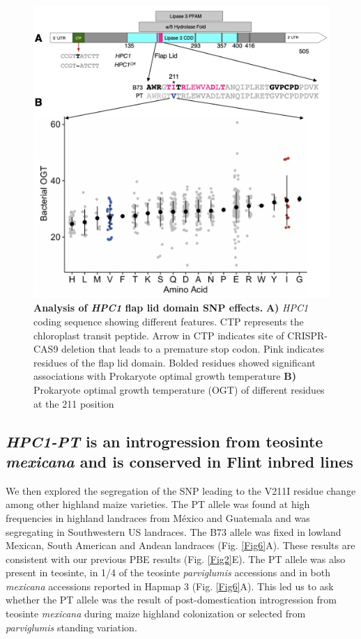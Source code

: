 \documentclass[9pt,twocolumn,twoside,lineno]{BioRxiv}
\begin{document}
\begin{figure}[!ht]
\begin{center}
\includegraphics[width=0.4\paperwidth]{Figures/Fig_5.png}
\caption{\textbf{Analysis of \textit{HPC1} flap lid domain SNP effects.}  
\textbf{A)} \textit{HPC1} coding sequence showing different features. 
CTP represents the chloroplast transit peptide. 
Arrow in CTP indicates site of CRISPR-CAS9 deletion that leads to a premature stop codon.
Pink indicates residues of the flap lid domain.
Bolded residues showed significant associations with Prokaryote optimal growth temperature 
\textbf{B)} Prokaryote optimal growth temperature (OGT) of different residues at the 211 position}
\label{Fig5}
\end{center}
\end{figure}

\subsection{\textit{HPC1-PT} is an introgression from teosinte \textit{mexicana} and is conserved in Flint inbred lines} 
We then explored the segregation of the SNP leading to the V211I residue change among other highland maize varieties.
The PT allele was found at high frequencies in highland landraces from México and Guatemala and was segregating in Southwestern US landraces. 
The B73 allele was fixed in lowland Mexican, South American and Andean landraces (Fig. \ref{Fig6}A). 
These results are consistent with our previous PBE results (Fig. \ref{Fig2}E).
The PT allele was also present in teosinte, in 1/4 of the teosinte \textit{parviglumis} accessions and in both \textit{mexicana} accessions reported in Hapmap 3 \cite{Bukowski2017-ng} (Fig. \ref{Fig6}A). 
This led us to ask whether the PT allele was the result of post-domestication introgression from teosinte \textit{mexicana} during maize highland colonization or selected from \textit{parviglumis} standing variation.
\end{document}

